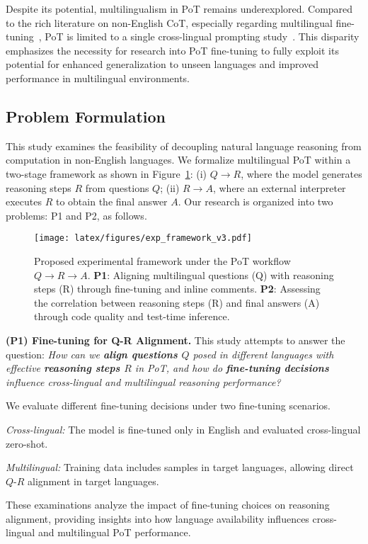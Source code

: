 
%
Despite its potential, multilingualism in PoT remains underexplored.
% 
Compared to the rich literature on non-English CoT, especially regarding multilingual fine-tuning~\cite{mathoctopus, mcot, mapo, qalign}, PoT is limited to a single cross-lingual prompting study~\cite{crosspal}.
%
This disparity emphasizes the necessity for research into PoT fine-tuning to fully exploit its potential for enhanced generalization to unseen languages and improved performance in multilingual environments.





\subsection{Problem Formulation}
This study examines the feasibility of decoupling natural language reasoning from computation in non-English languages.
%
We formalize multilingual PoT within a two-stage framework as shown in Figure~\ref{fig:exp-framework}: (i) 
$Q \rightarrow R$,  where the model generates reasoning steps $R$ from questions $Q$; (ii) $R \rightarrow A$, where an external interpreter executes $R$ to obtain the final answer $A$.
%
Our research is organized into two problems: P1 and P2, as follows.
%
\begin{figure}[htbp]
\centering
\texttt{[image: latex/figures/exp\_framework\_v3.pdf]}
    \caption{
    Proposed experimental framework under the PoT workflow $Q \rightarrow R \rightarrow A$. \textbf{P1}: Aligning multilingual questions (Q) with reasoning steps (R) through fine-tuning and inline comments. \textbf{P2}: Assessing the correlation between reasoning steps (R) and final answers (A) through code quality and test-time inference.
    }
    \label{fig:exp-framework}
    \vspace{-2mm}
\end{figure} 

\noindent
\textbf{(P1) Fine-tuning for Q-R Alignment.}
%
This study attempts to answer the question:
%
\emph{
How can we \textbf{align questions $Q$} posed in different languages with effective \textbf{reasoning steps $R$} in PoT, and how do \textbf{fine-tuning decisions} influence cross-lingual and multilingual reasoning performance?
}

We evaluate different fine-tuning decisions under two fine-tuning scenarios.
%
\begin{compactitem}
\item \emph{Cross-lingual:} The model is fine-tuned only in English and evaluated cross-lingual zero-shot.
%
\item \emph{Multilingual:} Training data includes samples in target languages, allowing direct $Q$-$R$ alignment in target languages.
% 
\end{compactitem}
These examinations analyze the impact of fine-tuning choices on reasoning alignment, providing insights into how language availability influences cross-lingual and multilingual PoT performance.

